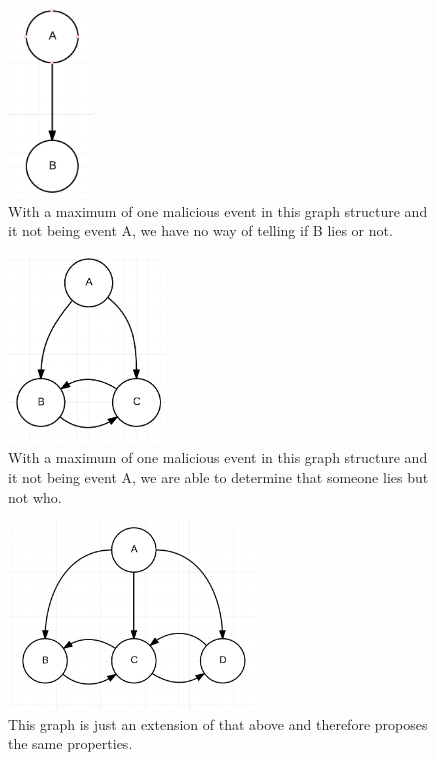 \begin{figure}[H]
	\centering
	\includegraphics[height=5cm]{figures/GraphStructure_OneToOne}
	\caption{With a maximum of one malicious event in this graph structure and it not being event A, we have no way of telling if B lies or not.}
\end{figure}

\begin{figure}[H]
	\centering
	\includegraphics[height=5cm]{figures/GraphStructure_OneToTwo}
	\caption{With a maximum of one malicious event in this graph structure and it not being event A, we are able to determine that someone lies but not who.}
\end{figure}

\begin{figure}[H]
	\centering
	\includegraphics[height=5cm]{figures/GraphStructure_OneToTwoChain}
	\caption{This graph is just an extension of that above and therefore proposes the same properties.}
\end{figure}

